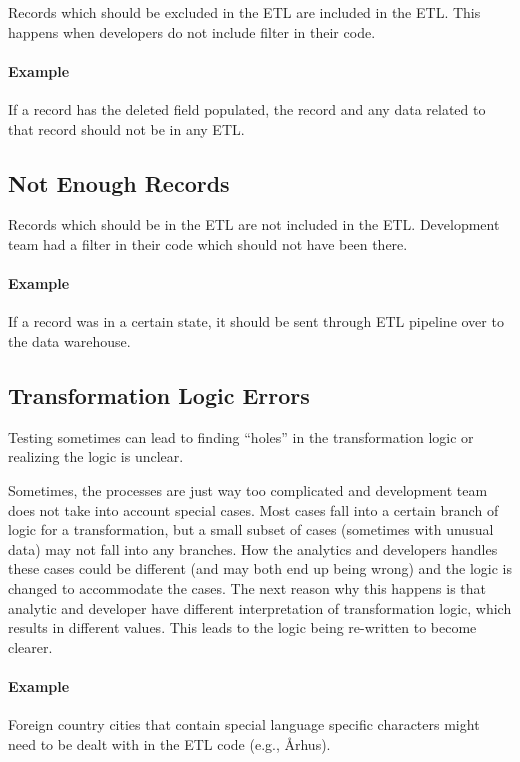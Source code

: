 Records which should be excluded in the ETL are included in the ETL.
This happens when developers do not include filter in their code.

\paragraph*{Example} If a record has the deleted field populated, the record and any data related to that record should not be in any ETL.

\subsection*{Not Enough Records}

Records which should be in the ETL are not included in the ETL.
Development team had a filter in their code which should not have been there.

\paragraph*{Example} If a record was in a certain state, it should be sent through ETL pipeline over to the data warehouse.

\subsection*{Transformation Logic Errors}

Testing sometimes can lead to finding \enquote{holes} in the transformation logic or realizing the logic is unclear.

Sometimes, the processes are just way too complicated and development team does not take into account special cases.
Most cases fall into a certain branch of logic for a transformation, but a small subset of cases (sometimes with unusual data) may not fall into any branches.
How the analytics and developers handles these cases could be different (and may both end up being wrong) and the logic is changed to accommodate the cases.
The next reason why this happens is that analytic and developer have different interpretation of transformation logic, which results in different values.
This leads to the logic being re-written to become clearer.

\paragraph*{Example} Foreign country cities that contain special language specific characters might need to be dealt with in the ETL code (e.g., Århus).

